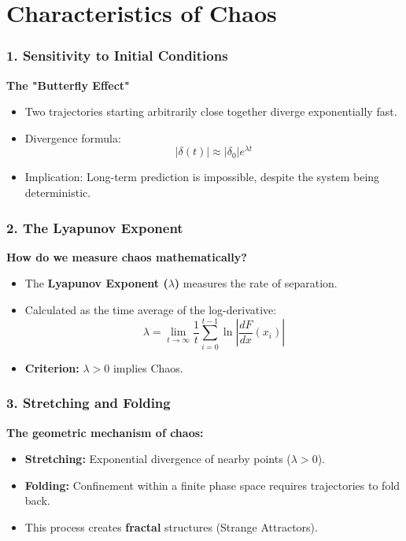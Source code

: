 \documentclass{beamer}
\begin{document}
\section{Characteristics of Chaos}

\begin{frame}
    \frametitle{1. Sensitivity to Initial Conditions}
    \textbf{The "Butterfly Effect"}
    \begin{itemize}
        \item Two trajectories starting arbitrarily close together diverge exponentially fast.
        \item Divergence formula:
        \[
        |\delta(t)| \approx |\delta_0| e^{\lambda t}
        \]
        \item Implication: Long-term prediction is impossible, despite the system being deterministic.
    \end{itemize}
\end{frame}

\begin{frame}
    \frametitle{2. The Lyapunov Exponent}
    \textbf{How do we measure chaos mathematically?}
    
    \begin{itemize}
        \item The \textbf{Lyapunov Exponent ($\lambda$)} measures the rate of separation.
        \item Calculated as the time average of the log-derivative:
        \[
        \lambda = \lim_{t \to \infty} \frac{1}{t} \sum_{i=0}^{t-1} \ln \left| \frac{dF}{dx}(x_i) \right|
        \]
        \item \textbf{Criterion:} $\lambda > 0$ implies Chaos.
    \end{itemize}
\end{frame}

\begin{frame}
    \frametitle{3. Stretching and Folding}
    \textbf{The geometric mechanism of chaos:}
    
    \begin{itemize}
        \item \textbf{Stretching:} Exponential divergence of nearby points ($\lambda > 0$).
        \item \textbf{Folding:} Confinement within a finite phase space requires trajectories to fold back.
        \item This process creates \textbf{fractal} structures (Strange Attractors).
    \end{itemize}
\end{frame}
\end{document}
